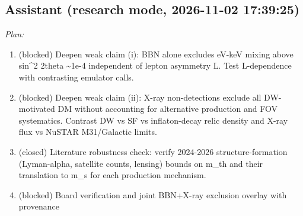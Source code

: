 \documentclass[11pt,a4paper]{article}
\begin{document}
\subsection*{Assistant \small(research mode, 2026-11-02 17:39:25)}
\textit{Plan:}\begin{enumerate}
  \item (blocked) Deepen weak claim (i): BBN alone excludes eV-keV mixing above sin\textasciicircum{}2 2theta \textasciitilde{}1e-4 independent of lepton asymmetry L. Test L-dependence with contrasting emulator calls.
  \item (blocked) Deepen weak claim (ii): X-ray non-detections exclude all DW-motivated DM without accounting for alternative production and FOV systematics. Contrast DW vs SF vs inflaton-decay relic density and X-ray flux vs NuSTAR M31/Galactic limits.
  \item (closed) Literature robustness check: verify 2024-2026 structure-formation (Lyman-alpha, satellite counts, lensing) bounds on m\_th and their translation to m\_s for each production mechanism.
  \item (blocked) Board verification and joint BBN+X-ray exclusion overlay with provenance
\end{enumerate}
\end{document}
